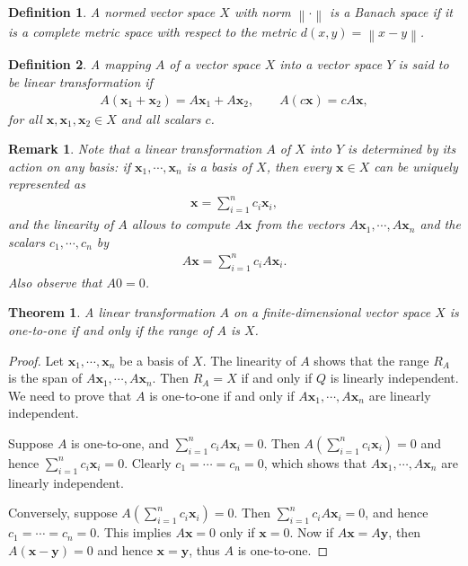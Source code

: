 \documentclass[10pt]{book}
\newtheorem{definition}{Definition}[chapter]
\newtheorem{theorem}{Theorem}[chapter]
\newtheorem{remark}{Remark}[chapter]
\theoremstyle{definition}
\numberwithin{equation}{chapter}
\begin{document}
\medskip

\begin{definition}
A normed vector space $X$ with norm $\left\|\cdot\right\|$ is a Banach space if it is a complete metric space with respect to the metric $d(x,y) = \left\|x - y\right\|$.
\end{definition}

\medskip

\begin{definition}
A mapping $A$ of a vector space $X$ into a vector space $Y$ is said to be linear transformation if 
\begin{align*}
    A(\mathbf{x}_1 + \mathbf{x}_2) = A \mathbf{x}_1 + A \mathbf{x}_2, \qquad A(c\mathbf{x}) = c A \mathbf{x},
\end{align*}
for all $\mathbf{x}, \mathbf{x}_1, \mathbf{x}_2 \in X$ and all scalars $c$. 
\end{definition}

\begin{remark}
Note that a linear transformation $A$ of $X$ into $Y$ is determined by its action on any basis: if $\mathbf{x}_1, \cdots, \mathbf{x}_n$ is a basis of $X$, then every $\mathbf{x} \in X$ can be uniquely represented as 
\begin{align*}
    \mathbf{x} = \sum^n_{i=1} c_i \mathbf{x}_i,
\end{align*}
and the linearity of $A$ allows to compute $A\mathbf{x}$ from the vectors $A\mathbf{x}_1, \cdots, A\mathbf{x}_n$ and the scalars $c_1, \cdots, c_n$ by
\begin{align*}
    A\mathbf{x} = \sum^n_{i=1} c_i A \mathbf{x}_i.
\end{align*}
Also observe that $A0 = 0$.
\end{remark}

\medskip

\begin{theorem}\label{th_71}
A linear transformation $A$ on a finite-dimensional vector space $X$ is one-to-one if and only if the range of $A$ is $X$.
\end{theorem}
\begin{proof}
Let $\mathbf{x}_1, \cdots, \mathbf{x}_n$ be a basis of $X$. The linearity of $A$ shows that the range $R_A$ is the span of $A\mathbf{x}_1, \cdots, A\mathbf{x}_n$. Then $R_A = X$ if and only if $Q$ is linearly independent. We need to prove that $A$ is one-to-one if and only if $A\mathbf{x}_1, \cdots, A\mathbf{x}_n$ are linearly independent.

Suppose $A$ is one-to-one, and $\sum^n_{i=1} c_i A \mathbf{x}_i = 0$. Then $A \left(\sum^n_{i=1} c_i \mathbf{x}_i\right) = 0$ and hence $\sum^n_{i=1} c_i \mathbf{x}_i = 0$. Clearly $c_1 = \cdots = c_n = 0$, which shows that $A\mathbf{x}_1, \cdots, A\mathbf{x}_n$ are linearly independent.

Conversely, suppose $A \left(\sum^n_{i=1} c_i \mathbf{x}_i\right) = 0$. Then $\sum^n_{i=1} c_i A \mathbf{x}_i = 0$, and hence $c_1 = \cdots = c_n = 0$. This implies $A\mathbf{x} = 0$ only if $\mathbf{x} = 0$. Now if $A\mathbf{x} = A\mathbf{y}$, then $A(\mathbf{x} - \mathbf{y}) = 0$ and hence $\mathbf{x} = \mathbf{y}$, thus $A$ is one-to-one.
\end{proof}
\end{document}
